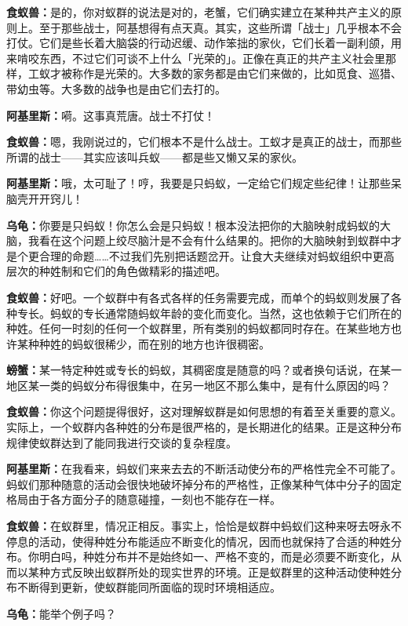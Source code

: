 \documentclass[
  12pt,
  twoside,
  openright,
  oldfontcommands,
]{memoir}
\newcommand{\dialogname}[1]{{\heifamily\bfseries #1}}
\begin{document}
\dialogname{食蚁兽：}是的，你对蚁群的说法是对的，老蟹，它们确实建立在某种共产主义的原则上。至于那些战士，阿基想得有点天真。其实，这些所谓「战士」几乎根本不会打仗。它们是些长着大脑袋的行动迟缓、动作笨拙的家伙，它们长着一副利颌，用来啃咬东西，不过它们可谈不上什么「光荣的」。正像在真正的共产主义社会里那样，工蚁才被称作是光荣的。大多数的家务都是由它们来做的，比如觅食、巡猎、带幼虫等。大多数的战争也是由它们去打的。

\dialogname{阿基里斯：}嗬。这事真荒唐。战士不打仗！

\dialogname{食蚁兽：}嗯，我刚说过的，它们根本不是什么战士。工蚁才是真正的战士，而那些所谓的战士------其实应该叫兵蚁------都是些又懒又呆的家伙。

\dialogname{阿基里斯：}哦，太可耻了！哼，我要是只蚂蚁，一定给它们规定些纪律！让那些呆脑壳开开窍儿！

\dialogname{乌龟：}你要是只蚂蚁！你怎么会是只蚂蚁！根本没法把你的大脑映射成蚂蚁的大脑，我看在这个问题上绞尽脑汁是不会有什么结果的。把你的大脑映射到蚁群中才是个更合理的命题\ldots\ldots 不过我们先别把话题岔开。让食大夫继续对蚂蚁组织中更高层次的种姓制和它们的角色做精彩的描述吧。

\dialogname{食蚁兽：}好吧。一个蚁群中有各式各样的任务需要完成，而单个的蚂蚁则发展了各种专长。蚂蚁的专长通常随蚂蚁年龄的变化而变化。当然，这也依赖于它们所在的种姓。任何一时刻的任何一个蚁群里，所有类别的蚂蚁都同时存在。在某些地方也许某种种姓的蚂蚁很稀少，而在别的地方也许很稠密。

\dialogname{螃蟹：}某一特定种姓或专长的蚂蚁，其稠密度是随意的吗？或者换句话说，在某一地区某一类的蚂蚁分布得很集中，在另一地区不那么集中，是有什么原因的吗？

\dialogname{食蚁兽：}你这个问题提得很好，这对理解蚁群是如何思想的有着至关重要的意义。实际上，一个蚁群内各种姓的分布是很严格的，是长期进化的结果。正是这种分布规律使蚁群达到了能同我进行交谈的复杂程度。

\dialogname{阿基里斯：}在我看来，蚂蚁们来来去去的不断活动使分布的严格性完全不可能了。蚂蚁们那种随意的活动会很快地破坏掉分布的严格性，正像某种气体中分子的固定格局由于各方面分子的随意碰撞，一刻也不能存在一样。

\dialogname{食蚁兽：}在蚁群里，情况正相反。事实上，恰恰是蚁群中蚂蚁们这种来呀去呀永不停息的活动，使得种姓分布能适应不断变化的情况，因而也就保持了合适的种姓分布。你明白吗，种姓分布并不是始终如一、严格不变的，而是必须要不断变化，从而以某种方式反映出蚁群所处的现实世界的环境。正是蚁群里的这种活动使种姓分布不断得到更新，使蚁群能同所面临的现时环境相适应。

\dialogname{乌龟：}能举个例子吗？
\end{document}
